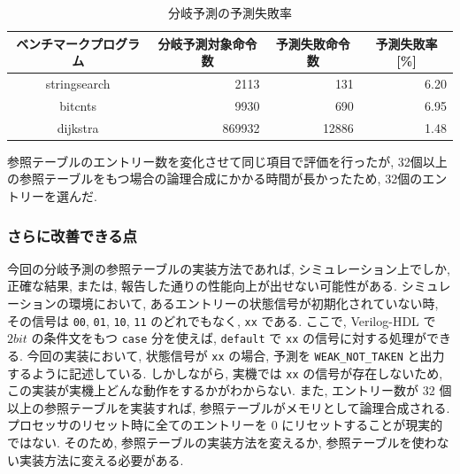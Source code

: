 \documentclass[../improvements.tex]{subflies}
\begin{document}
  \begin{table}[]
    \centering
    \begin{tabular}{|c|r|r|r|}
    \hline
    ベンチマークプログラム & \multicolumn{1}{c|}{分岐予測対象命令数} & \multicolumn{1}{c|}{予測失敗命令数} & \multicolumn{1}{c|}{予測失敗率 {[}\%{]}} \\ \hline
    stringsearch & 2113 & 131 & 6.20 \\
    bitcnts & 9930 & 690 & 6.95 \\
    dijkstra & 869932 & 12886 & 1.48 \\ \hline
    \end{tabular}
    \caption{分岐予測の予測失敗率}
    \label{table:miss-rate}
  \end{table}

  参照テーブルのエントリー数を変化させて同じ項目で評価を行ったが, 
  32個以上の参照テーブルをもつ場合の論理合成にかかる時間が長かったため, 
  32個のエントリーを選んだ.

  \subsubsection{さらに改善できる点}
  今回の分岐予測の参照テーブルの実装方法であれば, 
  シミュレーション上でしか, 正確な結果, または, 報告した通りの性能向上が出せない可能性がある.
  シミュレーションの環境において, あるエントリーの状態信号が初期化されていない時, 
  その信号は \verb|00|, \verb|01|, \verb|10|, \verb|11| のどれでもなく, \verb|xx| である.
  ここで, Verilog-HDL で $2bit$ の条件文をもつ \verb|case| 分を使えば, 
  \verb|default| で \verb|xx| の信号に対する処理ができる.
  今回の実装において, 状態信号が \verb|xx| の場合, 
  予測を \verb|WEAK_NOT_TAKEN| と出力するように記述している.
  しかしながら, 実機では \verb|xx| の信号が存在しないため, 
  この実装が実機上どんな動作をするかがわからない.
  また, エントリー数が 32 個以上の参照テーブルを実装すれば, 
  参照テーブルがメモリとして論理合成される.
  プロセッサのリセット時に全てのエントリーを 0 にリセットすることが現実的ではない.
  そのため, 参照テーブルの実装方法を変えるか, 参照テーブルを使わない実装方法に変える必要がある.
\end{document}
